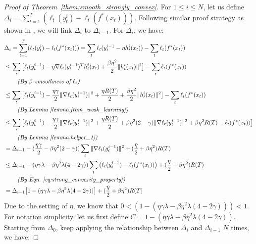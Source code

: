 \begin{proof}[Proof of Theorem~\ref{them:smooth_strongly_convex}]
For $1\leq i \leq N$, let us define $\Delta_i = \sum_{t=1}^T (\ell_t(y_t^i) - \ell_t(f^*(x_t)))$. Following similar proof strategy as shown in \citep{beygelzimer2015online}, we will link $\Delta_i$ to $\Delta_{i-1}$. For $\Delta_i$, we have:
\begin{align}
&\Delta_i = \sum_{t=1}^T (\ell_t(y_t^i) - \ell_t(f^*(x_t))) = \sum_t \ell_t(y_t^{i-1} - \eta h_t^i(x_t)) - \sum_t\ell_t(f^*(x_t)) \nonumber \\
& \leq  \sum_t \big[ \ell_t(y_t^{i-1}) - \eta\nabla\ell_t(y_t^{i-1})^T h_t^i(x_t) + \frac{\beta\eta^2}{2}\|h_t^i(x_t)\|^2    \big] - \sum_t\ell_t(f^*(x_t)) \nonumber \\
& \;\;\;\;\;\;\;\; \textit{(By $\beta$-smoothness of $\ell_t$)} \nonumber \\
& \leq \sum_t \big[ \ell_t(y_t^{i-1}) - \frac{\eta\gamma}{2}\|\nabla\ell_t(y_t^{i-1})\|^2 + \frac{\eta R(T)}{2}  + \frac{\beta\eta^2}{2}\|h_t^i(x_t)\|^2\big] - \sum_t\ell_t(f^*(x_t)) \nonumber \\
& \;\;\;\;\;\;\;\; \textit{(By Lemma~\ref{lemma:from_weak_learning})} \nonumber \\
&\leq \sum_t \big[ \ell_t(y_t^{i-1}) - \frac{\eta\gamma}{2}\|\nabla\ell_t(y_t^{i-1})\|^2 + \frac{\eta R(T)}{2}  + \beta\eta^2(2-\gamma)\|\nabla\ell_t(y_t^{i-1})\|^2 + \beta\eta^2R(T) - \ell_t(f^*(x_t))\big] \nonumber \\
& \;\;\;\;\;\;\;\; \textit{(By Lemma~\ref{lemma:helper_1})} \nonumber \\
& = \Delta_{i-1}- (\frac{\eta\gamma}{2} - \beta\eta^2(2-\gamma))\sum_t\|\nabla\ell_t(y_t^{i-1})\|^2 + (\frac{\eta}{2}+\beta\eta^2)R(T) \nonumber \\
&\leq \Delta_{i-1} - (\eta\gamma\lambda - \beta\eta^2\lambda(4-2\gamma))\sum_t\big(\ell_t(y_t^{i-1}) - \ell_t(f^*(x_t))\big) + (\frac{\eta}{2}+\beta\eta^2)R(T) \nonumber \\
& \;\;\;\;\;\;\;\; \textit{(By Eqn.~\ref{eq:strong_convexity_property})} \nonumber \\
& = \Delta_{i-1}\big[ 1 - (\eta\gamma\lambda - \beta\eta^2\lambda(4-2\gamma)) \big] + (\frac{\eta}{2}+\beta\eta^2)R(T)
\end{align}
Due to the setting of $\eta$, we know that $0<(1 - (\eta\gamma\lambda - \beta\eta^2\lambda(4-2\gamma))) <1$. For notation simplicity, let us first define $C = 1 - (\eta\gamma\lambda - \beta\eta^2\lambda(4-2\gamma))$. Starting from $\Delta_0$, keep applying the relationship between $\Delta_i$ and $\Delta_{i-1}$ $N$ times, we have:

\end{proof}
